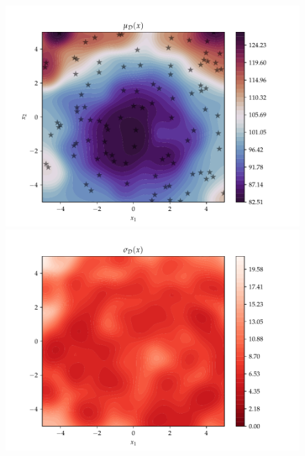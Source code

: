 \begin{figure}[h]
    \begin{minipage}[b]{0.49\textwidth}
      \includegraphics[trim=1.2cm 0.7cm 2cm 1cm,clip,width=\textwidth]{Figures/coco_reg/f1_Naive Gaussian Mixture Regression optimized2.pdf}
     \end{minipage}
     \hfill
     \begin{minipage}[b]{0.49\textwidth}
       \includegraphics[trim=1.2cm 0.7cm 2cm 1cm,clip,width=\textwidth]{Figures/coco_reg/f1_Naive Gaussian Mixture Regression optimized3.pdf}
    \end{minipage}
  \label{f1_reg_2D}
\end{figure}

